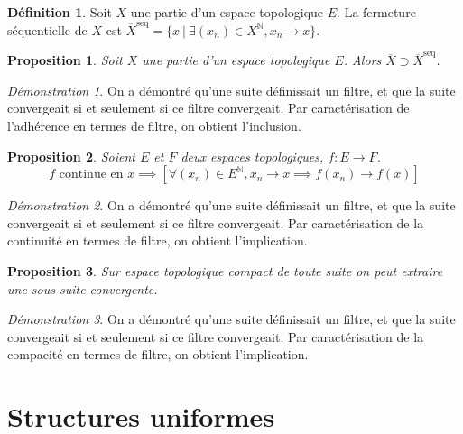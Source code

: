 \documentclass[a4paper, 11pt, french]{book}
\theoremstyle{plain} %
\newtheorem{proposition}{Proposition}
\theoremstyle{definition} %
\newtheorem{definition}{Définition}
\theoremstyle{remark} %
\newtheorem*{demonstration}{Démonstration}
\newcommand{\1}{\mathds{1}}
\newcommand{\N}{\mathbb{N}}
\renewcommand{\rm}[1]{\mathrm{#1}}
\newcommand\ens[2]{\{#1 \ |\ #2\}}
\begin{document}
\begin{definition}
	Soit $X$ une partie d'un espace topologique $E$.
	La fermeture séquentielle de $X$ est $\overline{X}^\rm{seq}=\ens{x}{\exists(x_n)\in X^\N, x_n\rightarrow x}$.
\end{definition}

\begin{proposition}
	Soit $X$ une partie d'un espace topologique $E$.
	Alors $\overline{X}\supset\overline{X}^\rm{seq}$.
\end{proposition}

\begin{demonstration}
	On a démontré qu'une suite définissait un filtre, et que la suite convergeait si et seulement si ce filtre convergeait.
	Par caractérisation de l'adhérence en termes de filtre, on obtient l'inclusion.
\end{demonstration}

\begin{proposition}
	Soient $E$ et $F$ deux espaces topologiques, $f:E\rightarrow F$.
	$$
		\text{$f$ continue en $x$}
		\implies
		\left[\forall(x_n)\in E^\N, x_n\rightarrow x\implies f(x_n)\rightarrow f(x)\right]
	$$
\end{proposition}

\begin{demonstration}
	On a démontré qu'une suite définissait un filtre, et que la suite convergeait si et seulement si ce filtre convergeait.
	Par caractérisation de la continuité en termes de filtre, on obtient l'implication.
\end{demonstration}

\begin{proposition}
	Sur espace topologique compact de toute suite on peut extraire une sous suite convergente.
\end{proposition}

\begin{demonstration}
	On a démontré qu'une suite définissait un filtre, et que la suite convergeait si et seulement si ce filtre convergeait.
	Par caractérisation de la compacité en termes de filtre, on obtient l'implication.
\end{demonstration}

\chapter{Structures uniformes}
\end{document}
